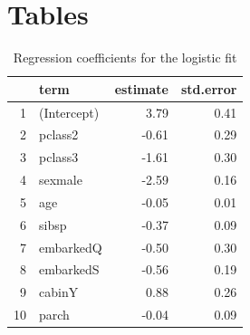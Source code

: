 \documentclass[]{extarticle}
\begin{document}
\section{Tables}
\begin{table}[H]
	\centering
	\begin{tabular}{rlrr}
		\hline
		& term & estimate & std.error \\ 
		\hline
		1 & (Intercept) & 3.79 & 0.41 \\ 
		2 & pclass2 & -0.61 & 0.29 \\ 
		3 & pclass3 & -1.61 & 0.30 \\ 
		4 & sexmale & -2.59 & 0.16 \\ 
		5 & age & -0.05 & 0.01 \\ 
		6 & sibsp & -0.37 & 0.09 \\ 
		7 & embarkedQ & -0.50 & 0.30 \\ 
		8 & embarkedS & -0.56 & 0.19 \\ 
		9 & cabinY & 0.88 & 0.26 \\ 
		10 & parch & -0.04 & 0.09 \\ 
		\hline
	\end{tabular}
\caption{Regression coefficients for the logistic fit}
\label{tab:regco}
\end{table}
\end{document}
